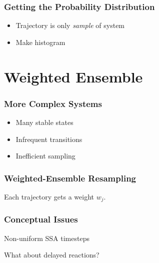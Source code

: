 \documentclass[xcolor={usenames,dvipsnames,svgnames}]{beamer}
\begin{document}
\begin{frame}
    \frametitle{Getting the Probability Distribution}
    \begin{itemize}
        \item Trajectory is only \emph{sample} of system
        \item Make histogram
    \end{itemize}
\end{frame}


\section{Weighted Ensemble} %
\label{sec:resampling}

\begin{frame}
    \frametitle{More Complex Systems}
    \begin{center}
        
    \end{center}

    \begin{itemize}
        \item Many stable states
        \item Infrequent transitions
        \item Inefficient sampling
    \end{itemize}
\end{frame}

\begin{frame}
    \frametitle{Weighted-Ensemble Resampling}
    Each trajectory gets a weight $w_j$.\\
    \begin{center}
        \begin{overprint}
            
            
            
            
            
        \end{overprint}
    \end{center}
\end{frame}

\begin{frame}
    \frametitle{Conceptual Issues}
    Non-uniform SSA timesteps

    \begin{center}
        
    \end{center}

    \pause
    What about delayed reactions?
\end{frame}
\end{document}
